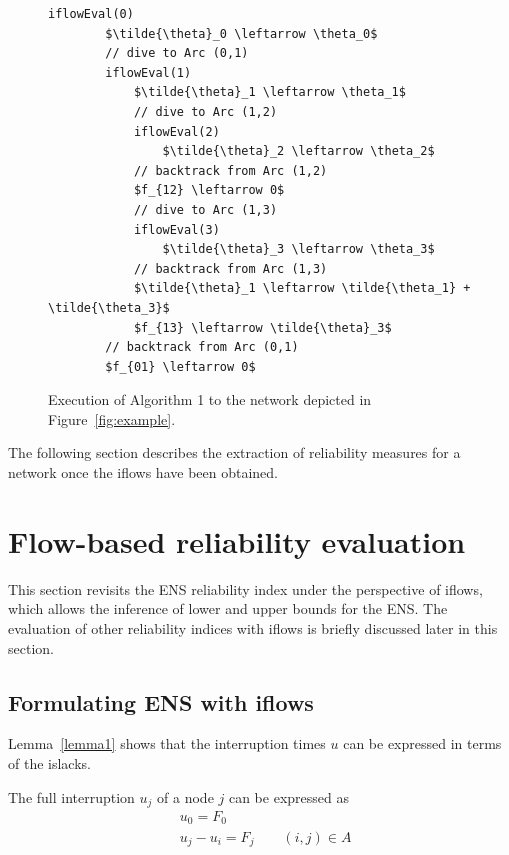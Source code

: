 \begin{figure}
    \centering
    \begin{lstlisting}[mathescape]
    iflowEval(0)
        $\tilde{\theta}_0 \leftarrow \theta_0$
        // dive to Arc (0,1)
        iflowEval(1)
            $\tilde{\theta}_1 \leftarrow \theta_1$
            // dive to Arc (1,2)
            iflowEval(2)
                $\tilde{\theta}_2 \leftarrow \theta_2$
            // backtrack from Arc (1,2)
            $f_{12} \leftarrow 0$
            // dive to Arc (1,3)
            iflowEval(3)
                $\tilde{\theta}_3 \leftarrow \theta_3$
            // backtrack from Arc (1,3)
            $\tilde{\theta}_1 \leftarrow \tilde{\theta_1} + \tilde{\theta_3}$
            $f_{13} \leftarrow \tilde{\theta}_3$
        // backtrack from Arc (0,1)
        $f_{01} \leftarrow 0$
\end{lstlisting}
\vspace{-1cm}
    \caption{Execution of Algorithm 1 to the network depicted in Figure~\ref{fig:example}.}
    \label{fig:code-execution}
\end{figure}


The following section describes the extraction of reliability measures for a network once the iflows have been obtained. 

\section{Flow-based reliability evaluation} \label{sec:Eval}


This section revisits the ENS reliability index under the perspective of iflows, which allows the inference of lower and upper bounds for the ENS.
The evaluation of other reliability indices with iflows is briefly discussed later in this section.

\subsection{Formulating ENS with iflows} \label{ssec:ENSiflow}

Lemma~\ref{lemma1} shows that the interruption times $u$ can be expressed in terms of the islacks.

\begin{lemma} \label{lemma1}
	The full interruption $u_j$ of a node $j$ can be expressed as
	\begin{subequations}
	\begin{align} 
		& \displaystyle u_0 = F_0 \label{eq:ttimeFrecA} \\
		& \displaystyle u_j - u_i = F_j \qquad (i,j) \in A \label{eq:ttimeFrecB}
	\end{align}
	\end{subequations}
\end{lemma}


